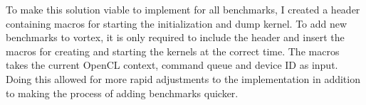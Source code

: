 
To make this solution viable to implement for all benchmarks, I created a header containing macros for starting the initialization and dump kernel. To add new benchmarks to \Gls{vortex}, it is only required to include the header and insert the macros for creating and starting the kernels at the correct time. The macros takes the current OpenCL context, command queue and device ID as input. Doing this allowed for more rapid adjustments to the implementation in addition to making the process of adding benchmarks quicker.






